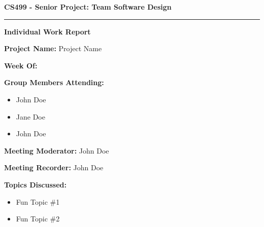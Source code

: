 \documentclass[12pt]{article}
\begin{document}

\begin{center}
\Large{\textbf{CS499 - Senior Project: Team Software Design}}
\rule{\textwidth}{1pt}
\end{center}


\begin{center}
\Large{\textbf{Individual Work Report}}
\end{center}

\vspace{5mm}

\begin{flushleft}
\textbf{Project Name:} Project Name \\
\end{flushleft}

\begin{flushleft}
\textbf{Week Of:}  \\
\end{flushleft}

\begin{flushleft}
\textbf{Group Members Attending:} \\
\begin{itemize}
    \item John Doe
    \item Jane Doe
    \item John Doe
\end{itemize}
\end{flushleft}

\begin{flushleft}
\textbf{Meeting Moderator:} John Doe \\
\end{flushleft}

\begin{flushleft}
\textbf{Meeting Recorder:} John Doe \\
\end{flushleft}

\begin{flushleft}
\textbf{Topics Discussed:} \\
\begin{itemize}
    \item Fun Topic \#1
    \item Fun Topic \#2
\end{itemize}
\end{flushleft}
\end{document}
